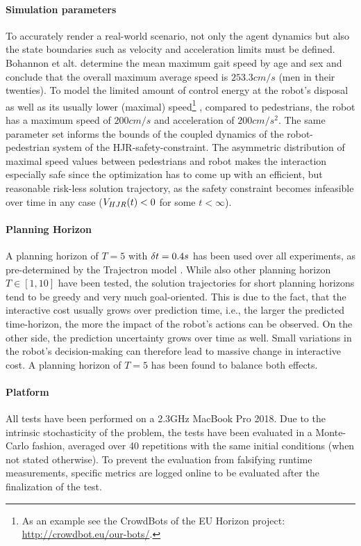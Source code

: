 \paragraph{Simulation parameters}
To accurately render a real-world scenario, not only the agent dynamics but also the state boundaries such as velocity and acceleration limits must be defined. Bohannon et alt. \cite{Bohannon1997} determine the mean maximum gait speed by age and sex and conclude that the overall maximum average speed is $253.3 cm/s$ (men in their twenties). To model the limited amount of control energy at the robot's disposal as well as its usually lower (maximal) speed\footnote{As an example see the CrowdBots of the EU Horizon project: \href{http://crowdbot.eu/our-bots/}{http://crowdbot.eu/our-bots/}.} , compared to pedestrians, the robot has a maximum speed of $200 cm/s$ and acceleration of $200 cm/s^2$. The same parameter set informs the bounds of the coupled dynamics of the robot-pedestrian system of the \ac{HJR}-safety-constraint. The asymmetric distribution of maximal speed values between pedestrians and robot makes the interaction especially safe since the optimization has to come up with an efficient, but reasonable risk-less solution trajectory, as the safety constraint becomes infeasible over time in any case ($V_{HJR}(t) < 0$ for some $t < \infty$).

\paragraph{Planning Horizon}
A planning horizon of $T = 5$ with $\delta t = 0.4 s$ has been used over all experiments, as pre-determined by the Trajectron model \cite{Ivanovic2018}. While also other planning horizon $T \in [1, 10]$ have been tested, the solution trajectories for short planning horizons tend to be greedy and very much goal-oriented. This is due to the fact, that the interactive cost usually grows over prediction time, i.e., the larger the predicted time-horizon, the more the impact of the robot's actions can be observed. On the other side, the prediction uncertainty grows over time as well. Small variations in the robot's decision-making can therefore lead to massive change in interactive cost. A planning horizon of $T = 5$ has been found to balance both effects.

\paragraph{Platform} 
All tests have been performed on a 2.3GHz MacBook Pro 2018. Due to the intrinsic stochasticity of the problem, the tests have been evaluated in a Monte-Carlo fashion, averaged over 40 repetitions with the same initial conditions (when not stated otherwise). To prevent the evaluation from falsifying runtime measurements, specific metrics are logged online to be evaluated after the finalization of the test.
